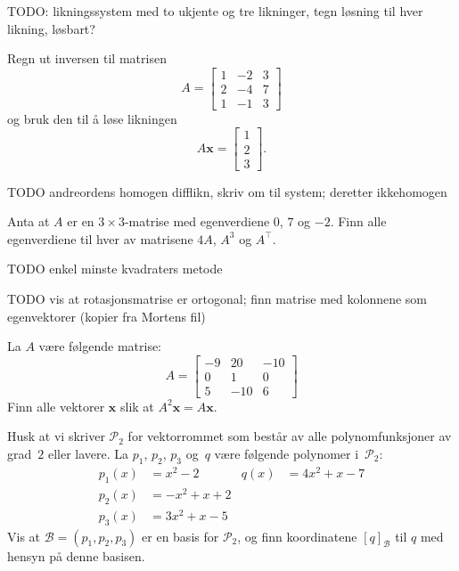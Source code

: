 \documentclass[titlepage,a4paper,12pt,norsk]{IMFeksamen}
\renewcommand{\P}{\mathcal{P}} %
\newcommand{\B}{\mathscr{B}} %
\DeclareMathOperator{\Sp}{Sp}
\newcommand{\tr}{^\top}
\newcommand{\V}[1]{\mathbf{#1}}
\newcommand{\vvv}[3]{\begin{bmatrix} #1 \\ #2 \\ #3 \end{bmatrix}}
\newcommand{\x}{\V{x}}
\newcommand{\0}{\V{0}}
\begin{document}
\begin{oppgave}
TODO: likningssystem med to ukjente og tre likninger, tegn løsning til hver likning, løsbart?
\end{oppgave}


\begin{oppgave}
Regn ut inversen til matrisen
\[
A =
\begin{bmatrix}
1 & -2 & 3 \\
2 & -4 & 7 \\
1 & -1 & 3
\end{bmatrix}
\]
og bruk den til å løse likningen
\[
A \x = \vvv{1}{2}{3}.
\]
\end{oppgave}


\begin{oppgave}
TODO andreordens homogen difflikn, skriv om til system; deretter ikkehomogen
\end{oppgave}


\begin{oppgave}
Anta at $A$ er en $3 \times 3$-matrise med egenverdiene $0$, $7$ og $-2$.
Finn alle egenverdiene til hver av matrisene $4A$, $A^3$ og $A\tr$.
\end{oppgave}


\begin{oppgave}
TODO enkel minste kvadraters metode
\end{oppgave}


\begin{oppgave}
TODO vis at rotasjonsmatrise er ortogonal; finn matrise med kolonnene som egenvektorer
(kopier fra Mortens fil)
\end{oppgave}


\begin{oppgave}
La $A$ være følgende matrise:
\[
A =
\begin{bmatrix}
-9 &  20 & -10 \\
 0 &   1 &   0 \\
 5 & -10 &   6
\end{bmatrix}
\]
Finn alle vektorer $\x$ slik at $A^2 \x = A \x$.
\end{oppgave}


\begin{oppgave}
Husk at vi skriver $\P_2$ for vektorrommet som består av alle
polynomfunksjoner av grad~$2$ eller lavere.  La $p_1$, $p_2$, $p_3$
og~$q$ være følgende polynomer i~$\P_2$:
\begin{align*}
p_1(x) &= x^2 - 2    &   q(x) &= 4x^2 + x - 7  \\
p_2(x) &= -x^2 + x + 2 \\
p_3(x) &= 3x^2 + x - 5
\end{align*}
Vis at $\B = (p_1, p_2, p_3)$ er en basis for $\P_2$,
og finn koordinatene $[ q ]_\B$ til $q$ med hensyn på denne basisen.
\end{oppgave}
\end{document}
